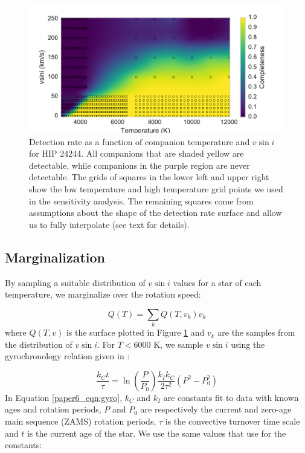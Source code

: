 \begin{figure}
\includegraphics[width=\columnwidth]{Figures/paper6_HIP_24244_20130919.pdf}
\caption{Detection rate as a function of companion temperature and $v\sin{i}$ for HIP 24244. All companions that are shaded yellow are detectable, while companions in the purple region are never detectable. The grids of squares in the lower left and upper right show the low temperature and high temperature grid points we used in the sensitivity analysis. The remaining squares come from assumptions about the shape of the detection rate surface and allow us to fully interpolate (see text for details).}
\label{paper6_fig:detrate_2d}
\end{figure}

\subsection{Marginalization}
By sampling a suitable distribution of $v\sin{i}$ values for a star of each temperature, we marginalize over the rotation speed:

\begin{equation}
Q(T) = \sum_k Q(T, v_k) v_k 
\end{equation} 
where $Q(T, v)$ is the surface plotted in Figure \ref{paper6_fig:detrate_2d} and $v_k$ are the samples from the distribution of $v\sin{i}$. For $T < 6000$ K, we sample $v\sin{i}$ using the gyrochronology relation given in \citet{Barnes2010b}:

\begin{equation}
\frac{k_Ct}{\tau} = \ln\left ( \frac{P}{P_0} \right ) \frac{k_Ik_C}{2\tau^2} (P^2 - P_0^2)
\label{paper6_eqn:gyro}
\end{equation}
In Equation \ref{paper6_eqn:gyro}, $k_C$ and $k_I$ are constants fit to data with known ages and rotation periods, $P$ and $P_0$ are respectively the current and zero-age main sequence (ZAMS) rotation periods, $\tau$ is the convective turnover time scale and $t$ is the current age of the star. We use the same values that \cite{Barnes2010b} use for the constants:

